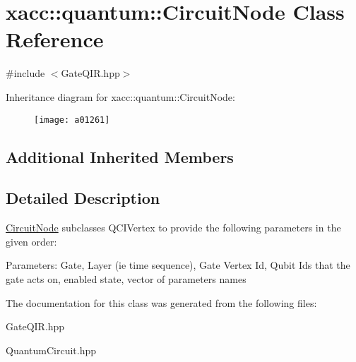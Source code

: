\hypertarget{a01261}{}\section{xacc\+:\+:quantum\+:\+:Circuit\+Node Class Reference}
\label{a01261}


{\ttfamily \#include $<$Gate\+Q\+I\+R.\+hpp$>$}

Inheritance diagram for xacc\+:\+:quantum\+:\+:Circuit\+Node\+:\begin{figure}[H]
\begin{center}
\leavevmode
\texttt{[image: a01261]}
\end{center}
\end{figure}
\subsection*{Additional Inherited Members}


\subsection{Detailed Description}
\hyperlink{a01261}{Circuit\+Node} subclasses Q\+C\+I\+Vertex to provide the following parameters in the given order\+:

Parameters\+: Gate, Layer (ie time sequence), Gate Vertex Id, Qubit Ids that the gate acts on, enabled state, vector of parameters names 

The documentation for this class was generated from the following files\+:\begin{DoxyCompactItemize}
\item 
Gate\+Q\+I\+R.\+hpp\item 
Quantum\+Circuit.\+hpp\end{DoxyCompactItemize}
